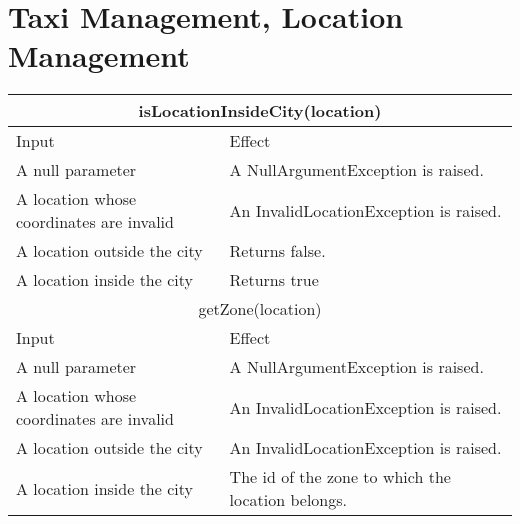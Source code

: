 \documentclass[11pt,oneside,a4paper]{report}
\begin{document}
\section{Taxi Management, Location Management}
\begin{table}[ph]
\centering
\begin{tabular}{p{5cm}|p{6cm}}
	\hline
	\multicolumn{2}{c}{isLocationInsideCity(location)}\\\hline
	Input & Effect \\\hline
	A null parameter &
	A NullArgumentException is raised. \\\hline
	A location whose coordinates are invalid &
	An InvalidLocationException is raised. \\\hline
	A location outside the city &
	Returns false. \\\hline
	A location inside the city &
	Returns true \\\hline\hline
		
	\multicolumn{2}{c}{getZone(location)}\\\hline
	Input & Effect \\\hline
	A null parameter &
	A NullArgumentException is raised. \\\hline
	A location whose coordinates are invalid &
	An InvalidLocationException is raised. \\\hline
	A location outside the city &
	An InvalidLocationException is raised. \\\hline
	A location inside the city &
	The id of the zone to which the location belongs. \\\hline\hline
	
\end{tabular}
\end{table}
\end{document}
